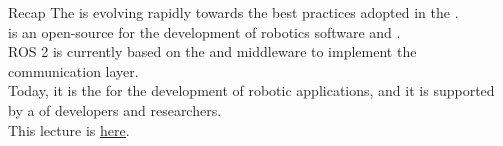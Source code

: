
\begin{frame}{Recap}
  \justifying
  The  is evolving rapidly towards the best practices adopted in the .\\
  \bigskip
   is an open-source  for the development of robotics software and .\\
  \bigskip
  ROS 2 is currently based on the  and  middleware to implement the communication layer.\\
  \bigskip
  Today, it is the  for the development of robotic applications, and it is supported by a  of developers and researchers.\\
  \bigskip
  \bigskip
  This lecture is \href{https://github.com/robmasocco/DAFN26_Robotics_5}{\color{blue}\underline{here}}.
\end{frame}
